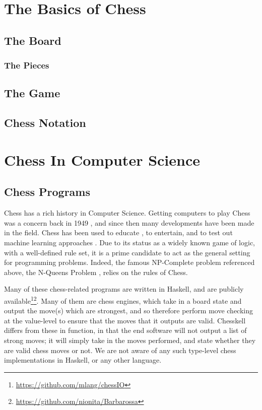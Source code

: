 \documentclass[12pt, a4paper, bibliography=totocnumbered]{scrreprt}
\begin{document}
\chapter{The Basics of Chess}

\section{The Board}

\subsection{The Pieces}

\section{The Game}

\section{Chess Notation}

\chapter{Chess In Computer Science}

\section{Chess Programs}

Chess has a rich history in Computer Science. Getting computers to play Chess was a concern back in 1949 \cite{1949chess}, and since then many developments have been made in the field. Chess has been used to educate \cite{chesseducation}, to entertain, and to test out machine learning approaches \cite{chessml}. Due to its status as a widely known game of logic, with a well-defined rule set, it is a prime candidate to act as the general setting for programming problems. Indeed, the famous NP-Complete problem referenced above, the N-Queens Problem \cite{nqueensnp}, relies on the rules of Chess.

Many of these chess-related programs are written in Haskell, and are publicly available\footnote{\url{https://github.com/mlang/chessIO}}\footnote{\url{https://github.com/nionita/Barbarossa}}. Many of them are chess engines, which take in a board state and output the move(s) which are strongest, and so therefore perform move checking at the value-level to ensure that the moves that it outputs are valid. Chesskell differs from these in function, in that the end software will not output a list of strong moves; it will simply take in the moves performed, and state whether they are valid chess moves or not. We are not aware of any such type-level chess implementations in Haskell, or any other language.
\end{document}
